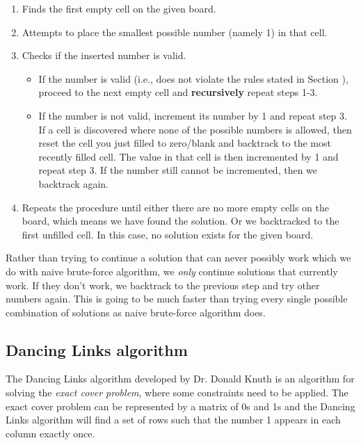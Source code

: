 \documentclass[12pt,a4paper]{article}
\begin{document}
	\begin{enumerate}
		\item Finds the first empty cell on the given board.
		\item Attempts to place the smallest possible number (namely \num{1}) in that cell.
		\item Checks if the inserted number is valid.
			\begin{itemize}
				\item If the number is valid (i.e., does not violate the rules stated in Section ),
				proceed to the next empty cell and \textbf{recursively} repeat steps \num{1}-\num{3}.
				\item If the number is not valid, increment its number by \num{1} and repeat step \num{3}. If a cell is
				discovered where none of the possible numbers is allowed, then reset the cell you just
				filled to zero/blank and backtrack to the most recently filled cell. The value in that
				cell is then incremented by \num{1} and repeat step \num{3}.
				If the number still cannot be incremented, then we backtrack again.
			\end{itemize}
		\item Repeats the procedure until either there are no more empty cells on the board, which means
		we have found the solution. Or we backtracked to the first unfilled cell. In this case, no
		solution exists for the given board.
	\end{enumerate}

	Rather than trying to continue a solution that can never possibly work which we do with naive
	brute-force algorithm, we \textit{only} continue solutions that currently work.
	If they don’t work, we backtrack to the previous step and try other numbers again.
	This is going to be much faster than trying every single possible combination of solutions
	as naive brute-force algorithm does.

	\subsection{Dancing Links algorithm}
	The Dancing Links algorithm developed by Dr. Donald Knuth is an algorithm for solving the \textit{exact cover problem},
	where some constraints need to be applied. The exact cover problem can be represented by a matrix of \num{0}s and \num{1}s and
	the Dancing Links algorithm will find a set of rows such that the number \num{1} appears in each column exactly once.
	\cite{knuth2000dancing}\cite{java-dancing-links}\cite{wiki:DLX} 
	
\end{document}
